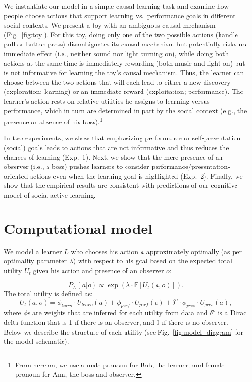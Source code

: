 \documentclass[10pt, letterpaper]{article}
\begin{document}
We instantiate our model in a simple causal learning task and examine
how people choose actions that support learning vs.~performance goals in
different social contexts. We present a toy with an ambiguous causal
mechanism (Fig.~\ref{fig:toy}). For this toy, doing only one of the two
possible actions (handle pull or button press) disambiguates its causal
mechanism but potentially risks no immediate effect (i.e., neither sound
nor light turning on), while doing both actions at the same time is
immediately rewarding (both music and light on) but is not informative
for learning the toy's causal mechanism. Thus, the learner can choose
between the two actions that will each lead to either a new discovery
(exploration; learning) or an immediate reward (exploitation;
performance). The learner's action rests on relative utilities he
assigns to learning versus performance, which in turn are determined in
part by the social context (e.g., the presence or absence of his
boss).\footnote{From here on, we use a male pronoun for Bob, the learner, and female pronoun for Ann, the boss and observer.}

In two experiments, we show that emphasizing performance or
self-presentation (social) goals leads to actions that are not
informative and thus reduces the chances of learning (Exp.~1). Next, we
show that the mere presence of an observer (i.e., a boss) pushes
learners to consider performance/presentation-oriented actions even when
the learning goal is highlighted (Exp.~2). Finally, we show that the
empirical results are consistent with predictions of our cognitive model
of social-active learning.

\section{Computational model}\label{computational-model}

We model a learner \(L\) who chooses his action \(a\) approximately
optimally (as per optimality parameter \(\lambda\)) with respect to his
goal based on the expected total utility \(U_{t}\) given his action and
presence of an observer \(o\):

\[ P_L(a | o) \propto \exp(\lambda \cdot \mathbb{E}[U_{t}(a,o)]).\]
\noindent
The total utility is defined as:
\[U_{t}(a,o) = \phi_{learn} \cdot U_{learn}(a) + \phi_{perf} \cdot U_{perf}(a) + \delta^o \cdot \phi_{pres} \cdot U_{pres}(a),\]
\noindent
where \(\phi\)s are weights that are inferred for each utility from data
and \(\delta^o\) is a Dirac delta function that is 1 if there is an
observer, and 0 if there is no observer. Below we describe the structure
of each utility (see Fig.~\ref{fig:model_diagram} for the model
schematic).
\end{document}
